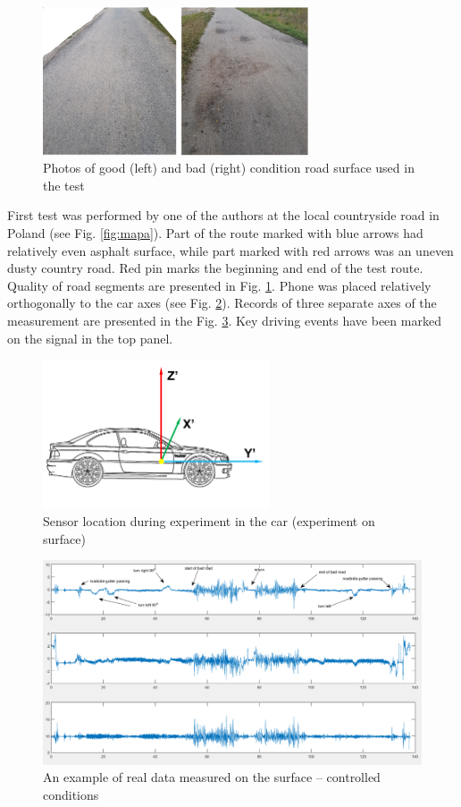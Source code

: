 \documentclass[10pt]{article}
\begin{document}
\begin{figure}[ht!]
\centering
\includegraphics[width=0.7\textwidth]{wykresy/droga.png}
\caption{Photos of good (left) and bad (right) condition road surface used in the test}
\label{fig:droga}
\end{figure}
First test was performed by one of the authors at the local countryside road in Poland (see Fig. \ref{fig:mapa}). Part of the route marked with blue arrows had relatively even asphalt surface, while part marked with red arrows was an uneven dusty country road. Red pin marks the beginning and end of the test route. Quality of road segments are presented in Fig. \ref{fig:droga}.
Phone was placed relatively orthogonally to the car axes (see Fig. \ref{fig:car}). Records of three separate axes of the measurement are presented in the Fig. \ref{fig:raw}. Key driving events have been marked on the signal in the top panel.

\begin{figure}[ht!]
\centering
\includegraphics[width=0.6\textwidth]{wykresy/car.png}
\caption{Sensor location during experiment in the car (experiment on surface)}
\label{fig:car}
\end{figure}

\begin{figure}[ht!]
\centering
\includegraphics[width=\textwidth]{wykresy/raw.png}
\caption{An example of real data measured on the surface -- controlled conditions}
\label{fig:raw}
\end{figure}
\end{document}
